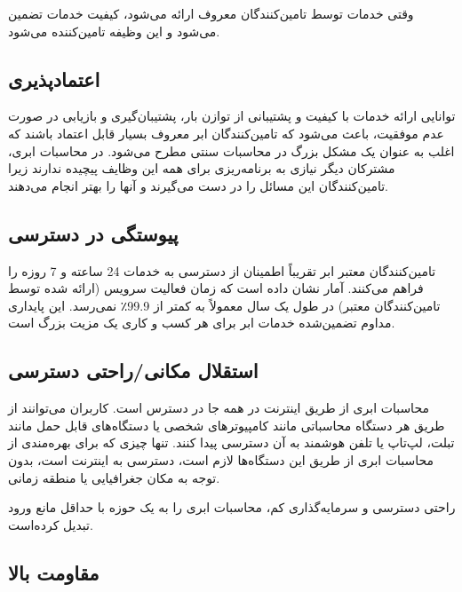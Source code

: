 \documentclass{book}
\begin{document}
    \begin{addinfo}
        
        وقتی خدمات توسط تامین‌کنندگان معروف ارائه می‌شود، کیفیت خدمات تضمین می‌شود و این وظیفه تامین‌کننده می‌شود.

    \end{addinfo}

    \subsection{اعتماد‌پذیری}

        توانایی ارائه خدمات با کیفیت و پشتیبانی از توازن بار، پشتیبان‌گیری و بازیابی در صورت عدم موفقیت، باعث می‌شود که تامین‌کنندگان ابر معروف بسیار قابل اعتماد باشند که اغلب به عنوان یک مشکل بزرگ در محاسبات سنتی مطرح می‌شود. در محاسبات ابری، مشترکان دیگر نیازی به برنامه‌ریزی برای همه این وظایف پیچیده ندارند زیرا تامین‌کنندگان این مسائل را در دست می‌گیرند و آنها را بهتر انجام می‌دهند.

    \subsection{پیوستگی در دسترسی}

        تامین‌کنندگان معتبر ابر تقریباً اطمینان از دسترسی به خدمات 24 ساعته و 7 روزه را فراهم می‌کنند. آمار نشان داده است که زمان فعالیت سرویس (ارائه شده توسط تامین‌کنندگان معتبر) در طول یک سال معمولاً به کمتر از 99.9٪ نمی‌رسد. این پایداری مداوم تضمین‌شده خدمات ابر برای هر کسب و کاری یک مزیت بزرگ است.

    \subsection{استقلال مکانی/راحتی دسترسی}

        محاسبات ابری از طریق اینترنت در همه جا در دسترس است. کاربران می‌توانند از طریق هر دستگاه محاسباتی مانند کامپیوترهای شخصی یا دستگاه‌های قابل حمل مانند تبلت، لپ‌تاپ یا تلفن هوشمند به آن دسترسی پیدا کنند. تنها چیزی که برای بهره‌مندی از محاسبات ابری از طریق این دستگاه‌ها لازم است، دسترسی به اینترنت است، بدون توجه به مکان جغرافیایی یا منطقه زمانی.

    \begin{addinfo}

        راحتی دسترسی و سرمایه‌گذاری کم، محاسبات ابری را به یک حوزه با حداقل مانع ورود تبدیل کرده‌است.

    \end{addinfo}

    \subsection{مقاومت بالا}
\end{document}
